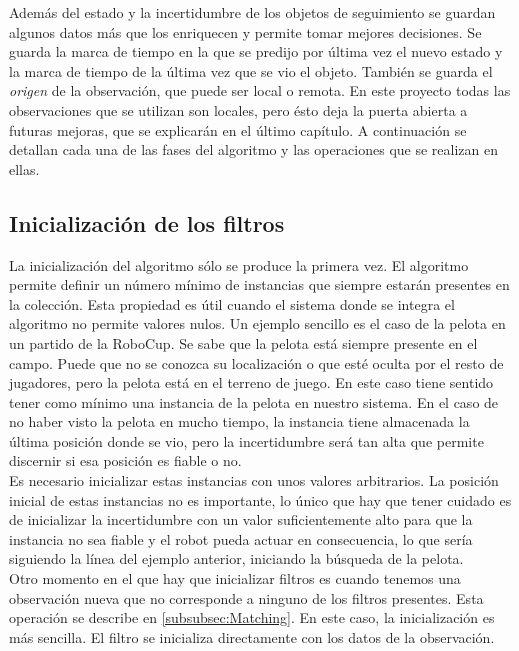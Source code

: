Además del estado y la incertidumbre de los objetos de seguimiento se guardan algunos datos más que los enriquecen y permite tomar mejores decisiones. Se guarda la marca de tiempo en la que se predijo por última vez el nuevo estado y la marca de tiempo de la última vez que se vio el objeto. También se guarda el \textit{origen} de la observación, que puede ser local o remota. En este proyecto todas las observaciones que se utilizan son locales, pero ésto deja la puerta abierta a futuras mejoras, que se explicarán en el último capítulo. A continuación se detallan cada una de las fases del algoritmo y las operaciones que se realizan en ellas.\\

\subsection{Inicialización de los filtros}
\label{subsec:inicializacion}

La inicialización del algoritmo sólo se produce la primera vez. El algoritmo permite definir un número mínimo de instancias que siempre estarán presentes en la colección. Esta propiedad es útil cuando el sistema donde se integra el algoritmo no permite valores nulos. Un ejemplo sencillo es el caso de la pelota en un partido de la RoboCup. Se sabe que la pelota está siempre presente en el campo. Puede que no se conozca su localización o que esté oculta por el resto de jugadores, pero la pelota está en el terreno de juego. En este caso tiene sentido tener como mínimo una instancia de la pelota en nuestro sistema. En el caso de no haber visto la pelota en mucho tiempo, la instancia tiene almacenada la última posición donde se vio, pero la incertidumbre será tan alta que permite discernir si esa posición es fiable o no.\\

Es necesario inicializar estas instancias con unos valores arbitrarios. La posición inicial de estas instancias no es importante, lo único que hay que tener cuidado es de inicializar la incertidumbre con un valor suficientemente alto para que la instancia no sea fiable y el robot pueda actuar en consecuencia, lo que sería siguiendo la línea del ejemplo anterior, iniciando la búsqueda de la pelota. \\

Otro momento en el que hay que inicializar filtros es cuando tenemos una observación nueva que no corresponde a ninguno de los filtros presentes. Esta operación se describe en \ref{subsubsec:Matching}. En este caso, la inicialización es más sencilla. El filtro se inicializa directamente con los datos de la observación.

